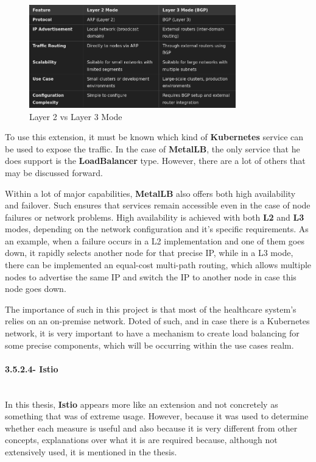 \begin{figure}[H]
    \centering
    \includegraphics[width=0.8\textwidth]{assets/tools/metallb/bgp-vs-l2.png} %
    \caption{Layer 2 vs Layer 3 Mode}
    \label{fig:sample-image} 
\end{figure}


To use this extension, it must be known which kind of \textbf{Kubernetes} service can be used to expose the traffic. In the case of \textbf{MetalLB}, the only service that he does support is the \textbf{LoadBalancer} type. However, there are a lot of others that may be discussed forward.

Within a lot of major capabilities, \textbf{MetalLB} also offers both high availability and failover. Such ensures that services remain accessible even in the case of node failures or network problems. High availability is achieved with both \textbf{L2} and \textbf{L3} modes, depending on the network configuration and it's specific requirements. As an example, when a failure occurs in a L2 implementation and one of them goes down, it rapidly selects another node for that precise IP, while in a L3 mode, there can be implemented an equal-cost multi-path routing, which allows multiple nodes to advertise the same IP and switch the IP to another node in case this node goes down.

The importance of such in this project is that most of the healthcare system's relies on an on-premise network. Doted of such, and in case there is a Kubernetes network, it is very important to have a mechanism to create load balancing for some precise components, which will be occurring within the use cases realm.

\paragraph{3.5.2.4- Istio}\mbox{}\\
In this thesis, \textbf{Istio} appears more like an extension and not concretely as something that was of extreme usage. However, because it was used to determine whether each measure is useful and also because it is very different from other concepts, explanations over what it is are required because, although not extensively used, it is mentioned in the thesis.

